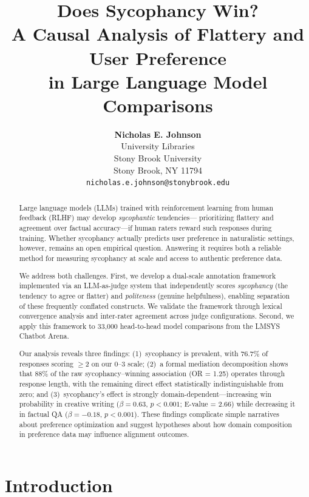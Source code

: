\documentclass[11pt,twocolumn,a4paper]{article}
\title{\textbf{Does Sycophancy Win?}\\
A Causal Analysis of Flattery and User Preference\\
in Large Language Model Comparisons}
\author{%
  \textbf{Nicholas E. Johnson} \\
  University Libraries \\
  Stony Brook University \\
  Stony Brook, NY 11794 \\
  \texttt{nicholas.e.johnson@stonybrook.edu}
}
\date{}
\begin{document}
\maketitle

\linenumbers

\begin{abstract}

Large language models (LLMs) trained with reinforcement learning from
human feedback (RLHF) may develop \emph{sycophantic} tendencies---%
prioritizing flattery and agreement over factual accuracy---if human
raters reward such responses during training. Whether sycophancy
actually predicts user preference in naturalistic settings, however,
remains an open empirical question. Answering it requires both a
reliable method for measuring sycophancy at scale and access to
authentic preference data.

We address both challenges. First, we develop a dual-scale annotation
framework implemented via an LLM-as-judge system that independently
scores \emph{sycophancy} (the tendency to agree or flatter) and
\emph{politeness} (genuine helpfulness), enabling separation of these
frequently conflated constructs. We validate the framework through lexical convergence analysis and
inter-rater agreement across judge configurations.
Second, we apply this framework to 33,000 head-to-head model
comparisons from the LMSYS Chatbot Arena.

Our analysis reveals three findings: (1)~sycophancy is
prevalent, with 76.7\% of responses scoring $\geq$2 on our 0--3
scale; (2)~a formal mediation decomposition shows that 88\% of the
raw sycophancy--winning association (OR = 1.25) operates through
response length, with the remaining direct effect statistically
indistinguishable from zero; and (3)~sycophancy's effect is strongly
domain-dependent---increasing win probability in creative writing
($\beta = 0.63$, $p < 0.001$; E-value = 2.66) while decreasing it
in factual QA ($\beta = -0.18$, $p < 0.001$). These findings
complicate simple narratives about preference optimization and suggest
hypotheses about how domain composition in preference data may
influence alignment outcomes.

\end{abstract}


\section{Introduction}
\label{sec:introduction}
\end{document}
